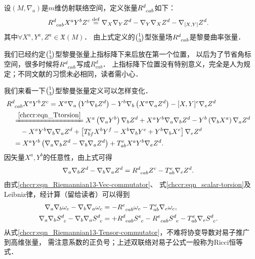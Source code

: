 \begin{definition}\label{chccr:def_tCurvatures}
    设$(M,\nabla_a)$是$m$维仿射联络空间，定义张量$R^{d}_{\hphantom{a} cab}$如下：
    \begin{equation}\label{chccr:eqn_RiemannianCurvature-13}
        R_{\hphantom{a} cab}^d{X^a}{Y^b}{Z^c} \overset{\mathrm {def}}{=} {\nabla _X}{\nabla _Y}{Z^d} -
        {\nabla _Y}{\nabla _X}{Z^d} - {\nabla _{[X,Y]}}{Z^d}.
    \end{equation}
    其中$\forall X^a, Y^a, Z^a \in \mathfrak{X}(M)$．
    由上式定义的$\binom{1}{3}$型张量场$R^{d}_{\hphantom{a} cab}$是{\heiti 黎曼曲率张量}．
\end{definition}
\begin{remark}
    我们已经约定$\binom{1}{3}$型黎曼张量上指标降下来后放在第一个位置，
    以后为了节省角标空间，很多时候将$R_{\hphantom{a} cab}^d$写成$R_{cab}^d$．
    上指标降下位置没有特别意义，完全是人为规定；不同文献的习惯未必相同，读者需小心．
\end{remark}

我们来看一下$\binom{1}{3}$型黎曼张量定义可以怎样变化．
\begin{align*}
    &R_{\hphantom{a} cab}^d{X^a}{Y^b}{Z^c} = {X^a}{\nabla _a}\left( {{Y^b}{\nabla _b}{Z^d}} \right) -
    {Y^b}{\nabla _b}\left( {{X^a}{\nabla _a}{Z^d}} \right) - {[X,Y]^e}{\nabla _e}{Z^d} \\
    &\quad \xlongequal{\eqref{chccr:eqn_Ttorsion}} {X^a}\left( {{\nabla _a}{Y^b}} \right){\nabla _b}{Z^d}
    + {X^a}{Y^b}{\nabla _a}{\nabla _b}{Z^d}
    - {Y^b}\left( {{\nabla _b}{X^a}} \right){\nabla _a}{Z^d}  \\
    &\qquad - {X^a}{Y^b}{\nabla _b}{\nabla _a}{Z^d} + \left[ {T_{bf}^e{X^b}{Y^f}
         - {X^b}{\nabla _b}{Y^e} + {Y^b}{\nabla _b}{X^e}} \right]{\nabla _e}{Z^d} \\
    &\quad = {X^a}{Y^b}\left( {{\nabla _a}{\nabla _b}{Z^d} - {\nabla _b}{\nabla _a}{Z^d}} \right)
    + T_{ab}^e{X^a}{Y^b}{\nabla _e}{Z^d} .
\end{align*}
因矢量$X^a,Y^b$的任意性，由上式可得
\begin{equation}\label{chccr:eqn_Riemannian13-Vec-commutator}
    \nabla_a \nabla_b Z^d - \nabla_b \nabla_a Z^d = R_{\hphantom{a} cab}^d Z^c - T_{ab}^e \nabla_e Z^d .
\end{equation}
由式\eqref{chccr:eqn_Riemannian13-Vec-commutator}、
式\eqref{chccr:eqn_scalar-torsion}及Leibniz律，经计算（留给读者）可以得到
\begin{align}
    {\nabla_a}{\nabla_b}{\omega_c} - {\nabla_b}{\nabla_a}{\omega_c} &= -R_{\hphantom{a} cab}^e{\omega _e}
    - T_{ab}^e{\nabla _e}{\omega _c},  \label{chccr:eqn_Riemannian13-CoVec-commutator} \\
    {\nabla _a}{\nabla _b}S_{ \hphantom{a} c}^d - {\nabla _b}{\nabla _a}S_{ \hphantom{a} c}^d &= 
    +R_{\hphantom{a} eab}^d S_{ \hphantom{a} c}^e
    - R_{\hphantom{a} cab}^eS_{ \hphantom{a} e}^d - T_{ab}^e{\nabla _e}S_{ \hphantom{a} c}^d . 
    \label{chccr:eqn_Riemannian13-Tensor-commutator}
\end{align}
从式\eqref{chccr:eqn_Riemannian13-Tensor-commutator}，不难将协变导数对易子推广到高维张量，
需注意系数的正负号；上述双联络对易子公式一般称为Ricci恒等式．


